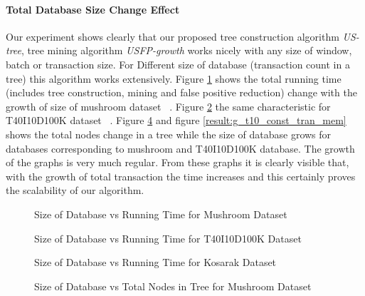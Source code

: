	\paragraph{Total Database Size Change Effect}Our experiment shows clearly that our proposed tree construction algorithm \emph{US-tree}, tree mining algorithm \emph{USFP-growth} works nicely with any size of window, batch or transaction size. For Different size of database (transaction count in a tree) this algorithm works extensively. Figure \ref{result:g_m_const_tran} shows the total running time (includes tree construction, mining and false positive reduction) change with the growth of size of mushroom dataset ~\cite{dataset}. Figure \ref{result:g_t10_const_tran} the same characteristic for T40I10D100K dataset ~\cite{dataset}. Figure \ref{result:g_m_const_tran_mem} and figure \ref{result:g_t10_const_tran_mem} shows the total nodes change in a tree while the size of database grows for databases corresponding to mushroom and T40I10D100K database. The growth of the graphs is very much regular. From these graphs it is clearly visible that, with the growth of total transaction the time increases and this certainly proves the scalability of our algorithm. 
		\begin{figure}[h]
		\centering
			
		\caption{Size of Database vs Running Time for Mushroom Dataset ~\cite{dataset}}
		\label{result:g_m_const_tran}
		\end{figure}
		\begin{figure}[h]
		\centering
			
		\caption{Size of Database vs Running Time for T40I10D100K Dataset ~\cite{dataset}}
		\label{result:g_t10_const_tran}
		\end{figure}
		\begin{figure}[h]
		\centering
			
		\caption{Size of Database vs Running Time for Kosarak Dataset ~\cite{dataset}}
		\label{result:g_k_const_tran}
		\end{figure}
		\begin{figure}[h]
		\centering
			
		\caption{Size of Database vs Total Nodes in Tree for Mushroom Dataset ~\cite{dataset}}
		\label{result:g_m_const_tran_mem}
		\end{figure}
